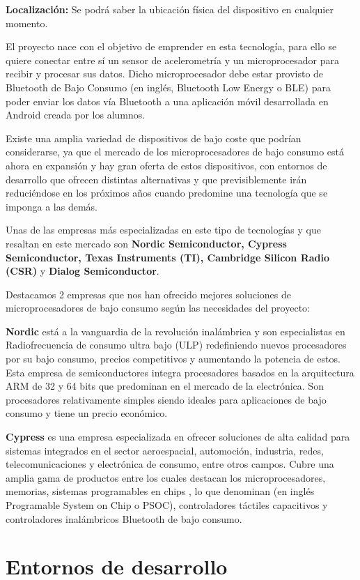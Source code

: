 \textbf{Localización:} Se podrá saber la ubicación física del dispositivo en cualquier momento.

El proyecto nace con el objetivo de emprender en esta tecnología, para ello se quiere conectar entre sí un sensor de acelerometría y un microprocesador para recibir y procesar sus datos. Dicho microprocesador debe estar provisto de Bluetooth de Bajo Consumo (en inglés, Bluetooth Low Energy o BLE) para poder enviar los datos vía Bluetooth a una aplicación móvil desarrollada en Android creada por los alumnos.

Existe una amplia variedad de dispositivos de bajo coste que podrían considerarse, ya que el mercado de los microprocesadores de bajo consumo está ahora en expansión y hay gran oferta de estos dispositivos, con entornos de desarrollo que ofrecen distintas alternativas y que previsiblemente irán reduciéndose en los próximos años cuando predomine una tecnología que se imponga a las demás.

Unas de las  empresas más especializadas en este tipo de tecnologías y que resaltan en este mercado son \textbf{Nordic Semiconductor, Cypress Semiconductor, Texas Instruments (TI), Cambridge Silicon Radio (CSR)} y \textbf{Dialog Semiconductor}.

Destacamos 2 empresas que nos han ofrecido mejores soluciones de microprocesadores de bajo consumo según las necesidades del proyecto:

\textbf{Nordic} está a la vanguardia de la revolución inalámbrica y son especialistas en Radiofrecuencia de consumo ultra bajo (ULP) redefiniendo nuevos procesadores por su bajo consumo, precios competitivos y aumentando la potencia de estos.
Esta empresa de semiconductores integra procesadores basados en la arquitectura ARM de 32 y 64 bits que predominan en el mercado de la electrónica. Son procesadores relativamente simples siendo ideales para aplicaciones de bajo consumo y tiene un precio económico. 

\textbf{Cypress} es una empresa especializada en ofrecer soluciones de alta calidad para sistemas integrados en el sector aeroespacial, automoción, industria, redes, telecomunicaciones y electrónica de consumo, entre otros campos. Cubre una amplia gama de productos entre los cuales destacan los microprocesadores, memorias,  sistemas programables en chips , lo que denominan (en inglés Programable System on Chip o PSOC), controladores táctiles capacitivos y controladores inalámbricos Bluetooth de bajo consumo.

\section{Entornos de desarrollo}
\label{makereference1.1}

